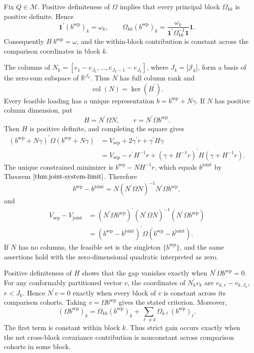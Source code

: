 Fix \(Q\in\mathcal M\). Positive definiteness of \(\Omega\) implies that every principal block \(\Omega_{kk}\) is positive definite. Hence
\[
 \mathbf 1^{\prime}(b^{\mathrm{sep}})_k=\omega_k,
 \qquad
 \Omega_{kk}(b^{\mathrm{sep}})_k
 =\frac{\omega_k}{\mathbf 1^{\prime}\Omega_{kk}^{-1}\mathbf 1}
 \mathbf 1.
\]
Consequently \(B^{\prime}b^{\mathrm{sep}}=\omega\), and the within-block contribution is constant across the comparison coordinates in block \(k\).

The columns of \(N_k=[e_1-e_{J_k},\ldots,e_{J_k-1}-e_{J_k}]\), where \(J_k=|\mathcal J_k|\), form a basis of the zero-sum subspace of \(\mathbb R^{J_k}\). Thus \(N\) has full column rank and
\[
 \operatorname{col}(N)=\ker(B^{\prime}).
\]
Every feasible loading has a unique representation \(b=b^{\mathrm{sep}}+N\gamma\). If \(N\) has positive column dimension, put
\[
 H=N^{\prime}\Omega N,
 \qquad
 r=N^{\prime}\Omega b^{\mathrm{sep}}.
\]
Then \(H\) is positive definite, and completing the square gives
\[
\begin{aligned}
 (b^{\mathrm{sep}}+N\gamma)^{\prime}\Omega
 (b^{\mathrm{sep}}+N\gamma)
 &=V_{\mathrm{sep}}+2\gamma^{\prime}r+
 \gamma^{\prime}H\gamma\\
 &=V_{\mathrm{sep}}-r^{\prime}H^{-1}r
 +(\gamma+H^{-1}r)^{\prime}H(\gamma+H^{-1}r).
\end{aligned}
\]
The unique constrained minimizer is \(b^{\mathrm{sep}}-NH^{-1}r\), which equals \(b^{\mathrm{joint}}\) by Theorem \(\ref{thm:joint-system-limit}\). Therefore
\[
 b^{\mathrm{sep}}-b^{\mathrm{joint}}
 =N(N^{\prime}\Omega N)^{-1}N^{\prime}\Omega b^{\mathrm{sep}},
\]
and
\[
\begin{aligned}
 V_{\mathrm{sep}}-V_{\mathrm{joint}}
 &=(N^{\prime}\Omega b^{\mathrm{sep}})^{\prime}
 (N^{\prime}\Omega N)^{-1}
 (N^{\prime}\Omega b^{\mathrm{sep}})\\
 &=(b^{\mathrm{sep}}-b^{\mathrm{joint}})^{\prime}
 \Omega(b^{\mathrm{sep}}-b^{\mathrm{joint}}).
\end{aligned}
\]
If \(N\) has no columns, the feasible set is the singleton \(\{b^{\mathrm{sep}}\}\), and the same assertions hold with the zero-dimensional quadratic interpreted as zero.

Positive definiteness of \(H\) shows that the gap vanishes exactly when \(N^{\prime}\Omega b^{\mathrm{sep}}=0\). For any conformably partitioned vector \(v\), the coordinates of \(N_k^{\prime}v_k\) are \(v_{k,r}-v_{k,J_k}\), \(r<J_k\). Hence \(N^{\prime}v=0\) exactly when every block of \(v\) is constant across its comparison cohorts. Taking \(v=\Omega b^{\mathrm{sep}}\) gives the stated criterion. Moreover,
\[
 (\Omega b^{\mathrm{sep}})_k
 =\Omega_{kk}(b^{\mathrm{sep}})_k
 +\sum_{\ell\ne k}\Omega_{k\ell}(b^{\mathrm{sep}})_\ell.
\]
The first term is constant within block \(k\). Thus strict gain occurs exactly when the net cross-block covariance contribution is nonconstant across comparison cohorts in some block.

